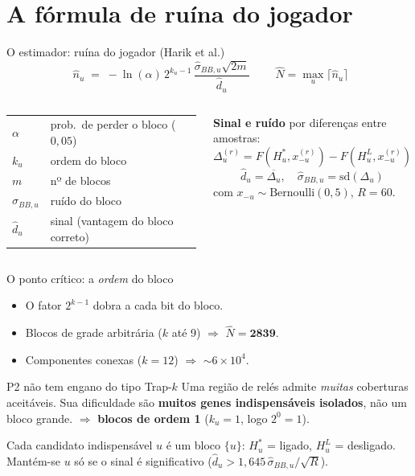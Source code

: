 \documentclass[aspectratio=169]{beamer}
\newcommand{\Nhat}{\hat{N}}
\begin{document}
\section{A fórmula de ruína do jogador}
\begin{frame}{O estimador: ruína do jogador (Harik et al.)}
\[
\boxed{\;\widehat{n}_u \;=\; -\ln(\alpha)\,2^{k_u-1}\,
\frac{\widehat{\sigma}_{BB,u}\sqrt{2m}}{\widehat{d}_u}\;}
\qquad \Nhat=\max_u\lceil \widehat n_u\rceil
\]
\vfill
\begin{columns}[T]
\small
\begin{tabular}{ll}
\toprule
$\alpha$ & prob.\ de perder o bloco ($0{,}05$)\\
$k_u$ & ordem do bloco\\
$m$ & nº de blocos\\
$\widehat\sigma_{BB,u}$ & ruído do bloco\\
$\widehat d_u$ & sinal (vantagem do bloco correto)\\
\bottomrule
\end{tabular}
\small
\textbf{Sinal e ruído} por diferenças entre amostras:
\[
\Delta_u^{(r)} = F(H_u^*,x_{-u}^{(r)})-F(H_u^L,x_{-u}^{(r)})
\]
\[
\widehat d_u=\overline{\Delta_u},\quad
\widehat\sigma_{BB,u}=\mathrm{sd}(\Delta_u)
\]
com $x_{-u}\sim\mathrm{Bernoulli}(0{,}5)$, $R=60$.
\end{columns}
\end{frame}

\begin{frame}{O ponto crítico: a \emph{ordem} do bloco}
\begin{itemize}
  \item O fator $2^{k-1}$ \alert{dobra a cada bit} do bloco.
  \item Blocos de grade arbitrária ($k$ até 9) $\Rightarrow$ $\Nhat=\mathbf{2839}$.
  \item Componentes conexas ($k=12$) $\Rightarrow$ $\sim\!6\times10^4$.
\end{itemize}
\vfill
\begin{alertblock}{P2 não tem engano do tipo Trap-$k$}
Uma região de relés admite \emph{muitas} coberturas aceitáveis. Sua dificuldade são
\textbf{muitos genes indispensáveis isolados}, não um bloco grande.
$\Rightarrow$ \textbf{blocos de ordem 1} ($k_u=1$, logo $2^{0}=1$).
\end{alertblock}
\vfill
\centering
Cada candidato indispensável $u$ é um bloco $\{u\}$: $H_u^*$ = ligado,
$H_u^L$ = desligado. Mantém-se $u$ só se o sinal é significativo
($\widehat d_u>1{,}645\,\widehat\sigma_{BB,u}/\sqrt R$).
\end{frame}
\end{document}
